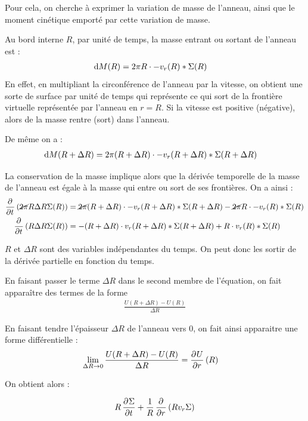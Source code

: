 Pour cela, on cherche à exprimer la variation de masse de l'anneau, ainsi que le moment cinétique emporté par cette variation de masse. 

Au bord interne $R$, par unité de temps, la masse entrant ou sortant de l'anneau est :
\begin{align}
\operatorname{d \!} M(R) &= 2\pi R \cdot -v_r(R) * \Sigma(R)
\end{align}
En effet, en multipliant la circonférence de l'anneau par la vitesse, on obtient une sorte de surface par unité de temps qui représente ce qui sort de la frontière virtuelle représentée par l'anneau en $r=R$. Si la vitesse est positive (négative), alors de la masse rentre (sort) dans l'anneau. 

De même on a : 
\begin{align}
\operatorname{d \!} M(R+\Delta R) &= 2\pi (R+\Delta R) \cdot -v_r(R+\Delta R) * \Sigma(R+\Delta R)
\end{align}

La conservation de la masse implique alors que la dérivée temporelle de la masse de l'anneau est égale à la masse qui entre ou sort de ses frontières. On a ainsi : 
\begin{align*}
\mathinner{ \dfrac{\partial{^{}}}{\partial{{t}^{}}} }\left(\cancel{2\pi} R \Delta R \Sigma(R)\right) &= \cancel{2\pi} (R+\Delta R) \cdot -v_r(R+\Delta R) * \Sigma(R+\Delta R) - \cancel{2\pi} R \cdot -v_r(R) * \Sigma(R)\\
\mathinner{ \dfrac{\partial{^{}}}{\partial{{t}^{}}} }\left(R \Delta R \Sigma(R)\right) &= - (R+\Delta R) \cdot v_r(R+\Delta R) * \Sigma(R+\Delta R) +  R \cdot v_r(R) * \Sigma(R)
\end{align*}

$R$ et $\Delta R$ sont des variables indépendantes du temps. On peut donc les sortir de la dérivée partielle en fonction du temps. 

En faisant passer le terme $\Delta R$ dans le second membre de l'équation, on fait apparaître des termes de la forme 
\begin{align*}
\frac{U(R+\Delta R) - U(R)}{\Delta R}
\end{align*}

En faisant tendre l'épaisseur $\Delta R$ de l'anneau vers 0, on fait ainsi apparaitre une forme différentielle : 
\begin{align*}
\lim_{\Delta R \rightarrow 0} \frac{U(R+\Delta R) - U(R)}{\Delta R} &= \mathinner{ \dfrac{\partial{^{}}U}{\partial{{r}^{}}} }(R)
\end{align*}

On obtient alors :
\begin{important}
\begin{align}
R\mathinner{ \dfrac{\partial{^{}}\Sigma}{\partial{{t}^{}}} } + \frac{1}{R}\mathinner{ \dfrac{\partial{^{}}}{\partial{{r}^{}}} }\left(R v_r \Sigma\right)\label{eq:conservation_masse}
\end{align}
\end{important}

